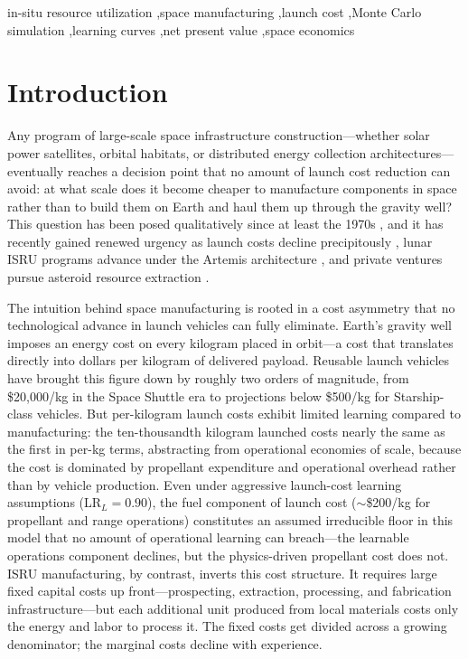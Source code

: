\documentclass[preprint,12pt]{elsarticle}
\begin{document}
\begin{frontmatter}
\begin{keyword}
in-situ resource utilization \sep space manufacturing \sep launch cost \sep Monte Carlo simulation \sep learning curves \sep net present value \sep space economics
\end{keyword}

\end{frontmatter}

\linenumbers

\section{Introduction}
\label{sec:introduction}

Any program of large-scale space infrastructure construction---whether solar power satellites, orbital habitats, or distributed energy collection architectures---eventually reaches a decision point that no amount of launch cost reduction can avoid: at what scale does it become cheaper to manufacture components in space rather than to build them on Earth and haul them up through the gravity well? This question has been posed qualitatively since at least the 1970s \cite{oneill1974,oneill1976}, and it has recently gained renewed urgency as launch costs decline precipitously \cite{jones2018}, lunar ISRU programs advance under the Artemis architecture \cite{sanders2015}, and private ventures pursue asteroid resource extraction \cite{elvis2012,andrews2015}.

The intuition behind space manufacturing is rooted in a cost asymmetry that no technological advance in launch vehicles can fully eliminate. Earth's gravity well imposes an energy cost on every kilogram placed in orbit---a cost that translates directly into dollars per kilogram of delivered payload. Reusable launch vehicles have brought this figure down by roughly two orders of magnitude, from \$20{,}000/kg in the Space Shuttle era to projections below \$500/kg for Starship-class vehicles. But per-kilogram launch costs exhibit limited learning compared to manufacturing: the ten-thousandth kilogram launched costs nearly the same as the first in per-kg terms, abstracting from operational economies of scale, because the cost is dominated by propellant expenditure and operational overhead rather than by vehicle production. Even under aggressive launch-cost learning assumptions (LR$_L = 0.90$), the fuel component of launch cost ($\sim$\$200/kg for propellant and range operations) constitutes an assumed irreducible floor in this model that no amount of operational learning can breach---the learnable operations component declines, but the physics-driven propellant cost does not. ISRU manufacturing, by contrast, inverts this cost structure. It requires large fixed capital costs up front---prospecting, extraction, processing, and fabrication infrastructure---but each additional unit produced from local materials costs only the energy and labor to process it. The fixed costs get divided across a growing denominator; the marginal costs decline with experience.
\end{document}
